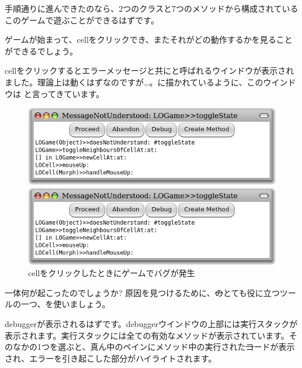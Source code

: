 \documentclass[a4paper,10pt,twoside]{book}
\begin{document}
手順通りに進んできたのなら、2つのクラスと7つのメソッドから構成されているこのゲームで遊ぶことができるはずです。


ゲームが始まって、cellをクリックでき、またそれがどの動作するかを見ることができるでしょう。

cellをクリックするとエラーメッセージと共にと呼ばれるウインドウが表示されました。理論上は動くはずなのですが\ldots{}。に描かれているように、このウインドウは と言ってきています。

\begin{figure}[ht]
\ifluluelse
	{\centerline{\includegraphics[width=\textwidth]{Error}}}
	{\centerline{\includegraphics[scale=0.7]{Error}}}
\caption{cellをクリックしたときにゲームでバグが発生
}
\end{figure}

\noindent
一体何が起こったのでしょうか? 原因を見つけるために、\st のとても役に立つツールの一つ、を使いましょう。


debuggerが表示されるはずです。debuggerウインドウの上部には実行スタックが表示されます。実行スタックには全ての有効なメソッドが表示されています。そのなかの1つを選ぶと、真ん中のペインにメソッド中の実行された\st コードが表示され、エラーを引き起こした部分がハイライトされます。

\end{document}
